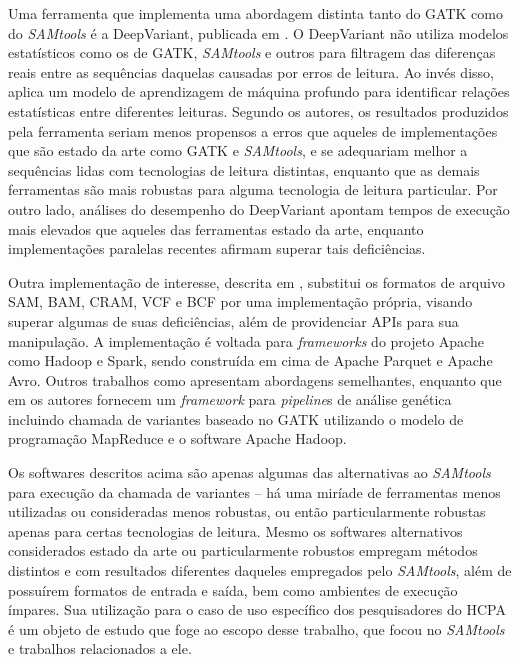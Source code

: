 \documentclass[cic,tc]{iiufrgs}
\begin{document}

Uma ferramenta que implementa uma abordagem distinta tanto do GATK como do
\textit{SAMtools} é a DeepVariant, publicada em \cite{poplin2018universal}. O DeepVariant
não utiliza modelos estatísticos como os de GATK, \textit{SAMtools} e outros para
filtragem das diferenças reais entre as sequências daquelas causadas por erros
de leitura. Ao invés disso, aplica um modelo de aprendizagem de máquina
profundo para identificar relações estatísticas entre diferentes leituras.
Segundo os autores, os resultados produzidos pela ferramenta seriam menos
propensos a erros que aqueles de implementações que são estado da arte como
GATK e \textit{SAMtools}, e se adequariam melhor a sequências lidas com tecnologias de
leitura distintas, enquanto que as demais ferramentas são mais robustas para
alguma tecnologia de leitura particular. Por outro lado, análises do desempenho
do DeepVariant apontam tempos de execução mais elevados que aqueles das
ferramentas estado da arte, enquanto implementações paralelas recentes afirmam
superar tais deficiências. \cite{ahmad2021vc}

Outra implementação de interesse, descrita em \cite{massie2013adam}, substitui
os formatos de arquivo SAM, BAM, CRAM, VCF e BCF por uma implementação própria,
visando superar algumas de suas deficiências, além de providenciar APIs para
sua manipulação. A implementação é voltada para \textit{frameworks} do projeto Apache
como Hadoop e Spark, sendo construída em cima de Apache Parquet e Apache Avro.
Outros trabalhos como \cite{boufea2017managing} apresentam abordagens
semelhantes, enquanto que em \cite{decap2015halvade} os autores fornecem um
\textit{framework} para \textit{pipeline}s de análise genética incluindo chamada de variantes
baseado no GATK utilizando o modelo de programação MapReduce e o software
Apache Hadoop.

Os softwares descritos acima são apenas algumas das alternativas ao \textit{SAMtools}
para execução da chamada de variantes -- há uma miríade de ferramentas menos
utilizadas ou consideradas menos robustas, ou então particularmente robustas
apenas para certas tecnologias de leitura. Mesmo os softwares alternativos
considerados estado da arte ou particularmente robustos empregam métodos
distintos e com resultados diferentes daqueles empregados pelo \textit{SAMtools}, além
de possuírem formatos de entrada e saída, bem como ambientes de execução
ímpares. Sua utilização para o caso de uso específico dos pesquisadores do HCPA
é um objeto de estudo que foge ao escopo desse trabalho, que focou no \textit{SAMtools}
e trabalhos relacionados a ele.
\end{document}
